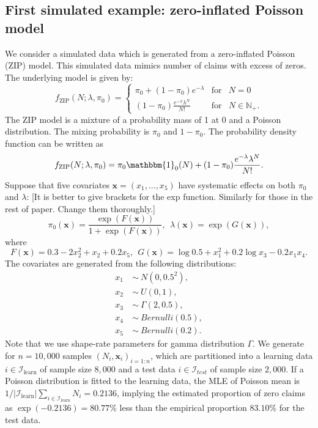 \documentclass[11pt]{article}
\numberwithin{equation}{section}
\def\N{{\mathbb N}}  %
\def\bx{\boldsymbol{x}}
\begin{document}
\subsection{First simulated example: zero-inflated Poisson model}

We consider a simulated data which is generated from a zero-inflated Poisson (ZIP) model. This simulated data mimics number of claims with excess of zeros.
The underlying  model is given by:
\begin{equation}
	f_{\text{ZIP}}(N;\lambda,\pi_0) = \left\{ 
	\begin{array}{ccl}
		\pi_0+(1-\pi_0)e^{-\lambda} & \mbox{for}
		& N=0 \\
		(1-\pi_0)\frac{e^{-\lambda}\lambda^N}{N!} & \mbox{for} &N\in\N_+.
	\end{array}\right.
\end{equation}
The ZIP model is a mixture of a probability mass of 1 at 0 and a Poisson distribution. The mixing probability is $\pi_0$ and $1-\pi_0$.
The probability density function can be written as
$$f_\text{ZIP}(N;\lambda,\pi_0)= \pi_0\mathbbm{1}_{0}(N) + 
(1-\pi_0)\frac{e^{-\lambda}\lambda^N}{N!}.$$
Suppose that five covariates $\bx=(x_1,\ldots,x_5)$ have systematic effects on both $\pi_0$ and $\lambda$: {\color{blue}[It is better to give brackets for the exp function. Similarly for those in the rest of paper. Change them thoroughly.]}
\begin{equation}
	\pi_0(\bx)=\frac{\exp \left(F(\bx)\right)}{1+\exp\left( F(\bx)\right)}, ~~
	\lambda(\bx)=\exp\left( G(\bx)\right), 
\end{equation}
where
\begin{equation}
	F(\bx)=0.3-2x_2^2+x_2+0.2x_5, ~~G(\bx)=\log 0.5+x_1^2 + 0.2\log x_3 - 0.2x_1 x_4.
\end{equation}
The covariates are generated from the following distributions:
\begin{align*}
	x_1~&\sim~N(0,0.5^2),\\
	x_2~&\sim~U(0,1), \\
	x_3~&\sim~\Gamma(2,0.5), \\
	x_4~&\sim~Bernulli(0.5),\\
	x_5~&\sim~Bernulli(0.2).
\end{align*}
Note that we use shape-rate parameters for gamma distribution $\Gamma$.
We generate for $n=10,000$ samples $(N_i,\bx_i)_{i=1:n}$, which are partitioned into a learning data $i\in\mathcal{I}_\text{learn}$ of sample size $8,000$ and a test data $i\in\mathcal{I}_{test}$ of sample size $2,000$. 
If a Poisson distribution is fitted to the learning data, the MLE of Poisson mean is $1/|\mathcal{I}_\text{learn}|\sum_{i\in\mathcal{I}_\text{learn}}N_i=0.2136$, implying the estimated proportion of zero claims as $\exp(-0.2136)=80.77\%$ less than the empirical proportion $83.10\%$ for the test data. 
\end{document}
